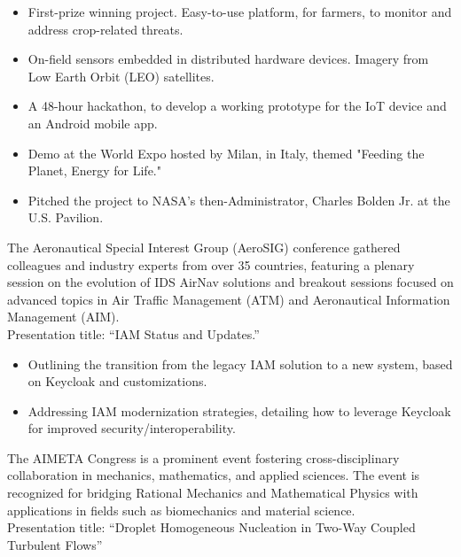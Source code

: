 	\divider

	\begin{itemize}
		\item First-prize winning project. Easy-to-use platform, for farmers, to monitor and address crop-related threats.
		\item On-field sensors embedded in distributed hardware devices. Imagery from Low Earth Orbit (LEO) satellites.
		\item A 48-hour hackathon, to develop a working prototype for the IoT device and an Android mobile app.
		\item Demo at the World Expo hosted by Milan, in Italy, themed "Feeding the Planet, Energy for Life."
		\item Pitched the project to NASA’s then-Administrator, Charles Bolden Jr. at the U.S. Pavilion.
	\end{itemize}

	The Aeronautical Special Interest Group (AeroSIG) conference gathered colleagues and industry experts from over 35 countries, featuring a plenary session on the evolution of IDS AirNav solutions and breakout sessions focused on advanced topics in Air Traffic Management (ATM) and Aeronautical Information Management (AIM). \\
	\medskip
	Presentation title: ``IAM Status and Updates.'' \\
	\smallskip
	\begin{itemize}
		\item Outlining the transition from the legacy IAM solution to a new system, based on Keycloak and customizations.
		\item Addressing IAM modernization strategies, detailing how to leverage Keycloak for improved security/interoperability.
	\end{itemize}

	\divider

	The AIMETA Congress is a prominent event fostering cross-disciplinary collaboration in mechanics, mathematics, and applied sciences. The event is recognized for bridging Rational Mechanics and Mathematical Physics with applications in fields such as biomechanics and material science. \\
	\medskip
	Presentation title: ``Droplet Homogeneous Nucleation in Two-Way Coupled Turbulent Flows''

